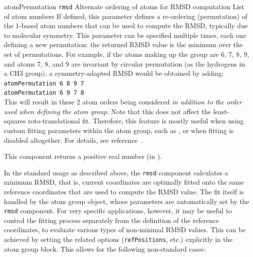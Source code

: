 \begin{cvcoptions}
\item %
  \key
    {atomPermutation}{%
    \texttt{rmsd}}{%
    Alternate ordering of atoms for RMSD computation}{%
    List of atom numbers}{%
    If defined, this parameter defines a re-ordering (permutation) of the 1-based atom numbers that
    can be used to compute the RMSD, typically due to molecular symmetry.
    This parameter can be specified multiple times, each one defining a new permutation:
    the returned RMSD value is the minimum over the set of permutations.
    For example, if the atoms making up the group are 6, 7, 8, 9, and atoms 7, 8, and 9
    are invariant by circular permutation (as the hydrogens in a CH3 group), a
    symmetry-adapted RMSD would be obtained by adding:\\
    \texttt{atomPermutation 6 8 9 7}\\
    \texttt{atomPermutation 6 9 7 8}\\
    This will result in these 2 atom orders being considered \emph{in addition to the order used when defining the atom group}.
    Note that this does not affect the least-squares roto-translational fit.
    Therefore, this feature is mostly useful when using custom fitting parameters within the
    atom group, such as , or when fitting
    is disabled altogether. For details, see reference~\cite{Ebrahimi2022}.
  }
\end{cvcoptions}
This component returns a positive real number (in \lengthunit).


In the standard usage as described above, the \texttt{rmsd} component
calculates a minimum RMSD, that is, current coordinates are optimally
fitted onto the same reference coordinates that are used to
compute the RMSD value. The fit itself is handled by the atom group
object, whose parameters are automatically set by the \texttt{rmsd}
component.
For very specific applications, however, it may be
useful to control the fitting process separately from the definition
of the reference coordinates, to evaluate various types of
non-minimal RMSD values. This can be achieved by setting the
related options (\texttt{refPositions}, etc.) explicitly in the
atom group block. This allows for the following non-standard cases:


